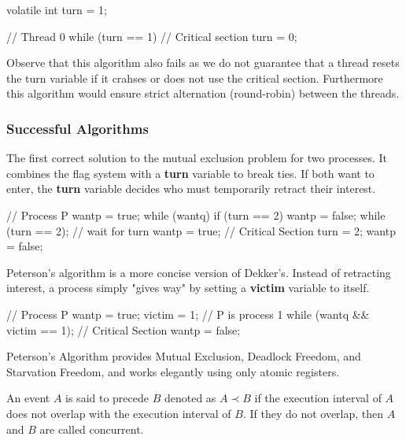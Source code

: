 \begin{algorithm}
volatile int turn = 1;

// Thread 0
while (turn == 1) {}
// Critical section
turn = 0;
\end{algorithm}

Observe that this algorithm also fails as we do not guarantee that a thread resets the turn variable if it crahses or does not use the critical section. Furthermore this algorithm would ensure strict alternation (round-robin) between the threads.


\subsubsection{Successful Algorithms}

The first correct solution to the mutual exclusion problem for two processes. It combines the flag system with a \textbf{turn} variable to break ties. If both want to enter, the \textbf{turn} variable decides who must temporarily retract their interest.

\begin{codeexample}
// Process P
wantp = true;
while (wantq) {
    if (turn == 2) {
        wantp = false;
        while (turn == 2); // wait for turn
        wantp = true;
    }
}
// Critical Section
turn = 2;
wantp = false;
\end{codeexample}

Peterson's algorithm is a more concise version of Dekker's. Instead of retracting interest, a process simply "gives way" by setting a \textbf{victim} variable to itself.

\begin{codeexample}
// Process P
wantp = true;
victim = 1; // P is process 1
while (wantq && victim == 1);
// Critical Section
wantp = false;
\end{codeexample}

\begin{theorem}
    Peterson's Algorithm provides Mutual Exclusion, Deadlock Freedom, and Starvation Freedom, and works elegantly using only atomic registers.
\end{theorem}

\begin{definition}
    An event $A$ is said to precede $B$ denoted as $A \prec B$ if the execution interval of $A$ does not overlap with the execution interval of $B$. If they do not overlap, then $A$ and $B$ are called concurrent.
\end{definition}

